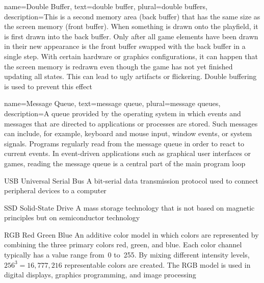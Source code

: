 
{
	name={Double Buffer},
	text={double buffer},
	plural={double buffers},
	description={This is a second memory area (back buffer) that has the same size as the screen memory (front buffer). When something is drawn onto the playfield, it is first drawn into the back buffer. Only after all game elements have been drawn in their new appearance	is the front buffer swapped with the back buffer in a single step. With certain hardware or graphics configurations, it can happen that the screen memory is redrawn even though the game has not yet finished updating all states. This can lead to ugly artifacts or flickering. Double buffering is used to prevent this effect}
}

{
	name={Message Queue},
	text={message queue},
	plural={message queues},
	description={A queue provided by the operating system in which events and messages that are directed to applications or processes are stored. Such messages can include, for example, keyboard and mouse input, window events, or system signals. Programs regularly read from the message queue in order to react to 	current events. In event-driven applications such as graphical user interfaces or games, reading the message queue is a central part of the main program loop}
}

	{USB}            %
	{Universal Serial Bus}  %
	{A bit-serial data transmission protocol used to connect peripheral	devices to a computer} %


	{SSD}            %
	{Solid-State Drive}  %
	{A mass storage technology that is not based on magnetic principles	but on semiconductor technology} %

	{RGB}            %
	{Red Green Blue}  %
	{An additive color model in which colors are represented by combining the three primary colors red, green, and blue. Each color channel typically has a value range from~0 to~255. By mixing different intensity levels, $256^3 = 16{,}777{,}216$	representable colors are created. The RGB model is used in digital displays, graphics programming,	and image processing} %

